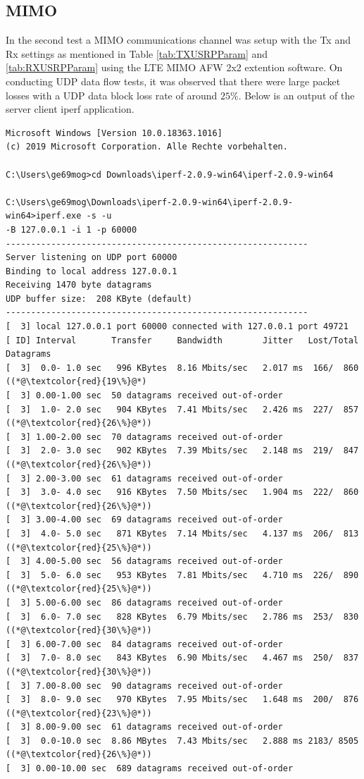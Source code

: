 \subsection{MIMO}\label{ssec:MIMOOTA}

In the second test a MIMO communications channel was setup with the Tx and Rx settings as mentioned in Table \ref{tab:TXUSRPParam} and \ref{tab:RXUSRPParam} using the LTE MIMO AFW 2x2 extention software. On conducting UDP data flow tests, it was observed that there were large packet losses with a UDP data block loss rate of around $25\%$. Below is an output of the server client iperf application.


\begin{lstlisting}[style=DOS]
Microsoft Windows [Version 10.0.18363.1016]
(c) 2019 Microsoft Corporation. Alle Rechte vorbehalten.

C:\Users\ge69mog>cd Downloads\iperf-2.0.9-win64\iperf-2.0.9-win64

C:\Users\ge69mog\Downloads\iperf-2.0.9-win64\iperf-2.0.9-win64>iperf.exe -s -u
-B 127.0.0.1 -i 1 -p 60000
------------------------------------------------------------
Server listening on UDP port 60000
Binding to local address 127.0.0.1
Receiving 1470 byte datagrams
UDP buffer size:  208 KByte (default)
------------------------------------------------------------
[  3] local 127.0.0.1 port 60000 connected with 127.0.0.1 port 49721
[ ID] Interval       Transfer     Bandwidth        Jitter   Lost/Total Datagrams
[  3]  0.0- 1.0 sec   996 KBytes  8.16 Mbits/sec   2.017 ms  166/  860 ((*@\textcolor{red}{19\%}@*)
[  3] 0.00-1.00 sec  50 datagrams received out-of-order
[  3]  1.0- 2.0 sec   904 KBytes  7.41 Mbits/sec   2.426 ms  227/  857 ((*@\textcolor{red}{26\%}@*))
[  3] 1.00-2.00 sec  70 datagrams received out-of-order
[  3]  2.0- 3.0 sec   902 KBytes  7.39 Mbits/sec   2.148 ms  219/  847 ((*@\textcolor{red}{26\%}@*))
[  3] 2.00-3.00 sec  61 datagrams received out-of-order
[  3]  3.0- 4.0 sec   916 KBytes  7.50 Mbits/sec   1.904 ms  222/  860 ((*@\textcolor{red}{26\%}@*))
[  3] 3.00-4.00 sec  69 datagrams received out-of-order
[  3]  4.0- 5.0 sec   871 KBytes  7.14 Mbits/sec   4.137 ms  206/  813 ((*@\textcolor{red}{25\%}@*))
[  3] 4.00-5.00 sec  56 datagrams received out-of-order
[  3]  5.0- 6.0 sec   953 KBytes  7.81 Mbits/sec   4.710 ms  226/  890 ((*@\textcolor{red}{25\%}@*))
[  3] 5.00-6.00 sec  86 datagrams received out-of-order
[  3]  6.0- 7.0 sec   828 KBytes  6.79 Mbits/sec   2.786 ms  253/  830 ((*@\textcolor{red}{30\%}@*))
[  3] 6.00-7.00 sec  84 datagrams received out-of-order
[  3]  7.0- 8.0 sec   843 KBytes  6.90 Mbits/sec   4.467 ms  250/  837 ((*@\textcolor{red}{30\%}@*))
[  3] 7.00-8.00 sec  90 datagrams received out-of-order
[  3]  8.0- 9.0 sec   970 KBytes  7.95 Mbits/sec   1.648 ms  200/  876 ((*@\textcolor{red}{23\%}@*))
[  3] 8.00-9.00 sec  61 datagrams received out-of-order
[  3]  0.0-10.0 sec  8.86 MBytes  7.43 Mbits/sec   2.888 ms 2183/ 8505 ((*@\textcolor{red}{26\%}@*))
[  3] 0.00-10.00 sec  689 datagrams received out-of-order

\end{lstlisting}

